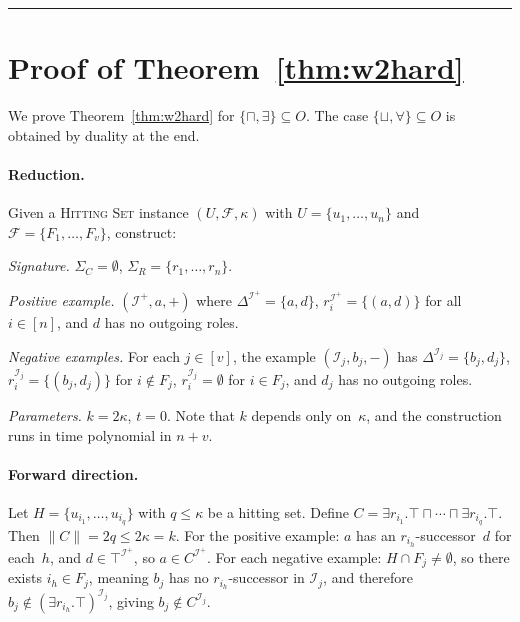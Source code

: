 \documentclass[accepted]{uai2026} %
\theoremstyle{definition}
\theoremstyle{remark}
\begin{document}
\vspace{0.6cm}

\noindent\rule{\textwidth}{0.8pt}

\vspace*{\fill}

\newpage

\section{Proof of Theorem~\ref{thm:w2hard}}\label{app:w2hard}

We prove Theorem~\ref{thm:w2hard} for
$\{\sqcap, \exists\} \subseteq O$. The case
$\{\sqcup, \forall\} \subseteq O$ is obtained by duality at the end.

\paragraph{Reduction.}
Given a \textsc{Hitting Set} instance
$(U, \mathcal{F}, \kappa)$ with $U = \{u_1, \ldots, u_n\}$ and
$\mathcal{F} = \{F_1, \ldots, F_v\}$, construct:

\emph{Signature.}
$\Sigma_C = \emptyset$,
$\Sigma_R = \{r_1, \ldots, r_n\}$.

\emph{Positive example.}
$(\mathcal{I}^+, a, +)$ where
$\Delta^{\mathcal{I}^+} = \{a, d\}$,
$r_i^{\mathcal{I}^+} = \{(a, d)\}$ for all $i \in [n]$, and
$d$ has no outgoing roles.

\emph{Negative examples.}
For each $j \in [v]$, the example $(\mathcal{I}_j, b_j, -)$ has
$\Delta^{\mathcal{I}_j} = \{b_j, d_j\}$,
$r_i^{\mathcal{I}_j} = \{(b_j, d_j)\}$ for $i \notin F_j$,
$r_i^{\mathcal{I}_j} = \emptyset$ for $i \in F_j$, and
$d_j$ has no outgoing roles.

\emph{Parameters.} $k = 2\kappa$, $t = 0$.
Note that $k$ depends only on~$\kappa$, and the construction
runs in time polynomial in $n + v$.

\paragraph{Forward direction.}
Let $H = \{u_{i_1}, \ldots, u_{i_q}\}$ with $q \leq \kappa$ be a
hitting set. Define
$C = \exists r_{i_1}.\top \sqcap \cdots \sqcap
\exists r_{i_q}.\top$.
Then $\|C\| = 2q \leq 2\kappa = k$.
For the positive example: $a$ has an $r_{i_h}$-successor~$d$ for
each~$h$, and $d \in \top^{\mathcal{I}^+}$, so $a \in C^{\mathcal{I}^+}$.
For each negative example: $H \cap F_j \neq \emptyset$, so there
exists $i_h \in F_j$, meaning $b_j$ has no $r_{i_h}$-successor in
$\mathcal{I}_j$, and therefore
$b_j \notin (\exists r_{i_h}.\top)^{\mathcal{I}_j}$, giving
$b_j \notin C^{\mathcal{I}_j}$.
\end{document}
